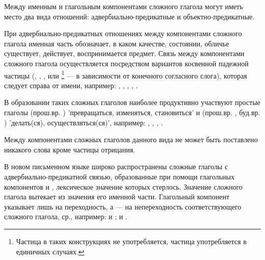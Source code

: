 Между именным и глагольным компонентами сложного глагола могут иметь место два вида отношений: адвербиально-предикатные и объектно-предикатные.

При адвербиально-предикатных отношениях между компонентами сложного глагола именная часть обозначает, в каком качестве, состоянии, обличье существует, действует, воспринимается предмет. Связь между компонентами сложного глагола осуществляется посредством вариантов косвенной падежной частицы (, , ,  или \footnote[35]{Частица  в таких конструкциях не употребляется, частица  употребляется в единичных случаях.} --- в зависимости от конечного согласного слога), которая следует справа от имени, например:
,
,
,
,
.

В образовании таких сложных глаголов наиболее продуктивно участвуют простые глаголы	 (прош.вр. ) 'превращаться, изменяться, становиться' и (прош.вр. , буд.вр. ) 'делать(ся), осуществляться(ся)', например:
,
,
,
.

Между компонентами сложных глаголов данного вида не может быть поставлено никакого слова кроме частицы отрицания.

В новом письменном языке широко распространены сложные глаголы с адвербиально-предикатной связью, образованные при помощи глагольных компонентов  и , лексическое значение которых стерлось. Значение сложного глагола вытекает из значения его именной части. Глагольный компонент  указывает лишь на переходность, а  --- на непереходность соответствующего сложного глагола, ср., например:
 и ;
 и .

